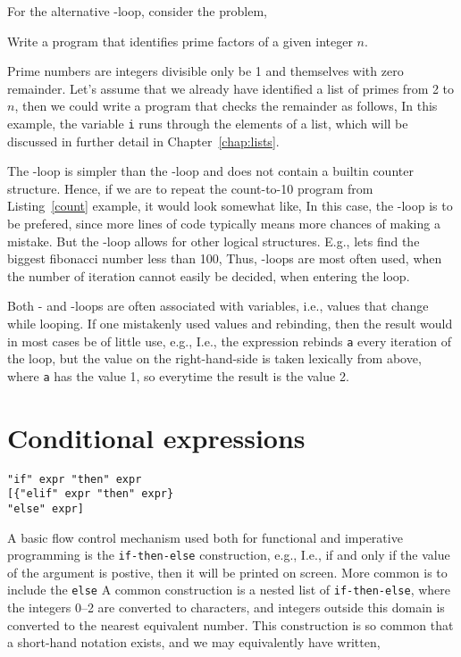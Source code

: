 For the alternative -loop, consider the problem,
\begin{problem}
  Write a program that identifies prime factors of a given integer $n$.
\end{problem}
Prime numbers are integers divisible only be 1 and themselves with zero remainder. Let's assume that we already have identified a list of primes from 2 to $n$, then we could write a program that checks the remainder as follows,
%
%
In this example, the variable \lstinline!i! runs through the elements of a list, which will be discussed in further detail in Chapter~\ref{chap:lists}.

The -loop is simpler than the -loop and does not contain a builtin counter structure. Hence, if we are to repeat the count-to-10 program from Listing~\ref{count} example, it would look somewhat like,
%
%
In this case, the -loop is to be prefered, since more lines of code typically means more chances of making a mistake. But the -loop allows for other logical structures. E.g., lets find the biggest fibonacci number less than 100,
%
%
Thus, -loops are most often used, when the number of iteration cannot easily be decided, when entering the loop.

Both - and -loops are often associated with variables, i.e., values that change while looping. If one mistakenly used values and rebinding, then the result would in most cases be of little use, e.g.,
%
%
I.e., the  expression rebinds \lstinline!a! every iteration of the loop, but the value on the right-hand-side is taken lexically from above, where \lstinline!a! has the value 1, so everytime the result is the value 2.

\section{Conditional expressions}
\begin{lstlisting}[language=ebnf]
"if" expr "then" expr 
[{"elif" expr "then" expr}
"else" expr]
\end{lstlisting}
A basic flow control mechanism used both for functional and imperative programming is the \texttt{if-then-else} construction, e.g.,
I.e., if and only if the value of the argument is postive, then it will be printed on screen. More common is to include the \texttt{else} 
A common construction is a nested list of \texttt{if-then-else},
where the integers 0--2 are converted to characters, and integers outside this domain is converted to the nearest equivalent number. This construction is so common that a short-hand notation exists, and we may equivalently have written,

